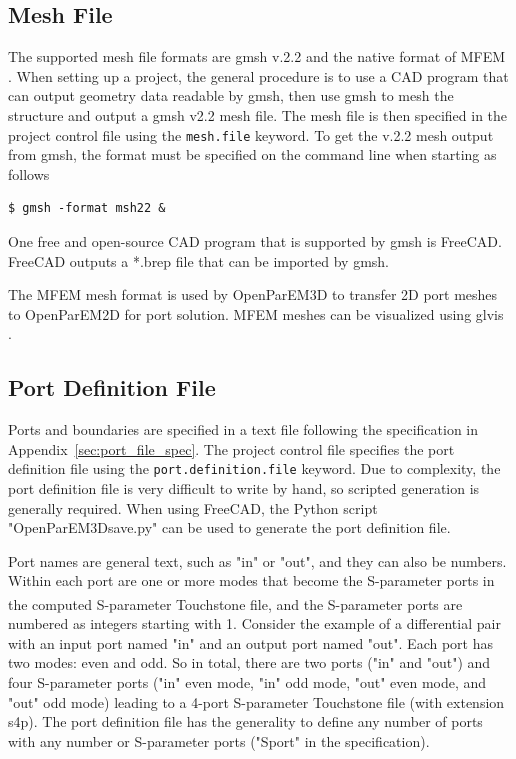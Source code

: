 \documentclass[titlepage]{article}
\renewcommand\_{\textunderscore\linebreak[1]}
\begin{document}
\subsection{Mesh File}

The supported mesh file formats are gmsh v.2.2 and the native format of MFEM \cite{MFEM}\cite{MFEMweb}.  When setting up a project, the general procedure is to use a CAD program that can output geometry data readable by gmsh, then use gmsh to mesh the structure and output a gmsh v2.2 mesh file.  The mesh file is then specified in the project control file using the \texttt{mesh.file} keyword.  To get the v.2.2 mesh output from gmsh, the format must be specified on the command line when starting as follows
\begin{Verbatim}[fontsize=\small]
   $ gmsh -format msh22 &
\end{Verbatim}
\noindent One free and open-source CAD program that is supported by gmsh is FreeCAD.  FreeCAD outputs a *.brep file that can be imported by gmsh.

The MFEM mesh format is used by OpenParEM3D to transfer 2D port meshes to OpenParEM2D for port solution. MFEM meshes can be visualized using glvis \cite{glvis}.  

\subsection{Port Definition File}
\label{sec:port_definition_file}

Ports and boundaries are specified in a text file following the specification in Appendix~\ref{sec:port_file_spec}.  The project control file specifies the port definition file using the \texttt{port.definition.file} keyword. Due to complexity, the port definition file is very difficult to write by hand, so scripted generation is generally required.  When using FreeCAD, the Python script "OpenParEM3D\_save.py" can be used to generate the port definition file.

Port names are general text, such as "in" or "out", and they can also be numbers. Within each port are one or more modes that become the S-parameter ports in the computed S-parameter Touchstone\textsuperscript{\textregistered} \cite{IBIS} file, and the S-parameter ports are numbered as integers starting with 1. Consider the example of a differential pair with an input port named "in" and an output port named "out". Each port has two modes: even and odd.  So in total, there are two ports ("in" and "out") and four S-parameter ports ("in" even mode, "in" odd mode, "out" even mode, and "out" odd mode) leading to a 4-port S-parameter Touchstone file (with extension s4p). The port definition file has the generality to define any number of ports with any number or S-parameter ports ("Sport" in the specification).
\end{document}
